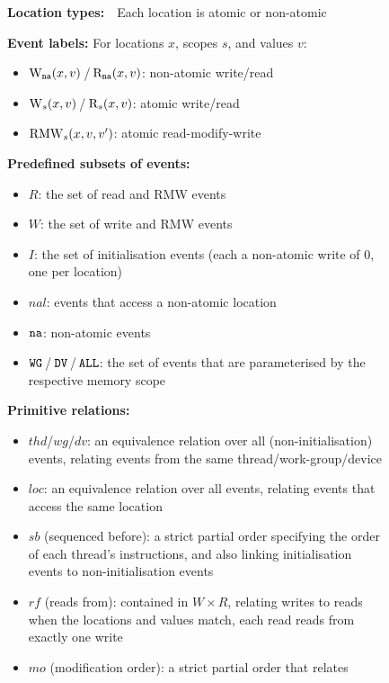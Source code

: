 \documentclass[svgnames,10pt]{sigplanconf}
\theoremstyle{definition}
\newcommand\var[1]{\mathit{#1}}
\newcommand\na{{\tt na}}
\newcommand\swg{{\tt WG}}
\newcommand\sdv{{\tt DV}}
\newcommand\sall{{\tt ALL}}
\newcommand\naL{\var{nal}}
\newcommand\Sb{\var{sb}}
\newcommand\thd{\var{thd}}
\newcommand\rf{\var{rf}}
\newcommand\mo{\var{mo}}
\newcommand\loc{\var{loc}}
\newcommand\wg{\var{wg}}
\newcommand\dv{\var{dv}}
\newcommand\evW{{\rm W}}
\newcommand\evR{{\rm R}}
\newcommand\evWna{{\rm W}_{\na}}
\newcommand\evRna{{\rm R}_{\na}}
\newcommand\evRMW{{\rm RMW}}
\begin{document}
\begin{figure}
\renewcommand\FrameSep{1mm}
\newcommand\myskip{\vspace*{1.5mm}}
\begin{shaded}
\newcommand\figureheading[1]{\textbf{#1:}}
 \figureheading{Location types}~~Each location is atomic or non-atomic
\par\medskip
\figureheading{Event labels} For locations $x$, scopes $s$, and values $v$:
\begin{itemize}[topsep=0pt, noitemsep]
\item $\evWna(x,v)$\,/\,$\evRna(x,v)$: non-atomic
write/read 
\item $\evW_{s}(x,v)$\,/\,$\evR_{s}(x,v)$: atomic write/read
\item $\evRMW_{s}(x,v,v')$: atomic read-modify-write
\end{itemize}
\par\myskip
\figureheading{Predefined subsets of events}
\begin{itemize}[topsep=0pt, noitemsep]
\item $R$: the set of read and RMW events
\item $W$: the set of write and RMW events
\item $I$: the set of initialisation events (each a non-atomic write of
$0$, one per location)
\item $\naL$: events that access a non-atomic location
\item $\na$: non-atomic events
\item $\swg$\,/\,$\sdv$\,/\,$\sall$: the set of events that are parameterised by the
respective memory scope
\end{itemize}
\myskip
\figureheading{Primitive relations}
\begin{itemize}[topsep=0pt, noitemsep]
\item $\thd$/$\wg$/$\dv$: an equivalence relation over all
(non-initialisation) events, relating events from the same thread/work-group/device
\item $\loc$: an equivalence relation over all events, relating events that access
the same location
\item $\Sb$ (sequenced before): a strict partial order specifying
the order of each thread's instructions, and also linking initialisation events to non-initialisation events
\item $\rf$ (reads from): contained in $W \times R$, relating writes to
reads when the locations and values match, each read reads from
exactly one write
\item $\mo$ (modification order): a strict partial order that relates

\end{itemize}
\end{shaded}
\end{figure}
\end{document}
